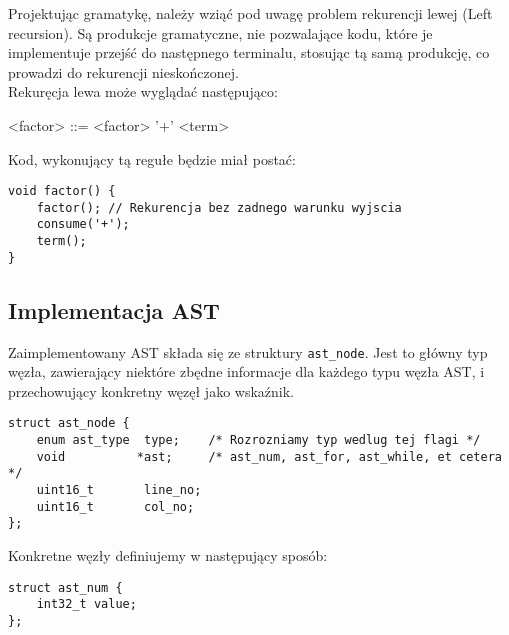 \documentclass[a4paper, 12pt]{extarticle}
\newcommand{\spacing}{\vskip 0.5cm}
\begin{document}
			Projektując gramatykę, należy wziąć pod uwagę problem rekurencji lewej (Left recursion).
			Są produkcje gramatyczne, nie pozwalające kodu, które je implementuje przejść do następnego
			terminalu, stosując tą samą produkcję, co prowadzi do rekurencji nieskończonej.
			\\
			
			Rekuręcja lewa może wyglądać następująco:

		    \begin{grammar}
		    	<factor> ::= <factor> '+' <term>
			\end{grammar}

			\spacing

			Kod, wykonujący tą regułe będzie miał postać:
			
			\begin{lstlisting}[caption={Rekurencja lewa}, label={lst:left-recursion}]
void factor() {
	factor(); // Rekurencja bez zadnego warunku wyjscia
	consume('+');
	term();
}
			\end{lstlisting}
			
			\newpage

		\subsection{Implementacja AST}

			Zaimplementowany AST składa się ze struktury \texttt{ast_node}. Jest to główny typ
			węzła, zawierający niektóre zbędne informacje dla każdego typu węzła AST, i przechowujący
			konkretny węzęł jako wskaźnik.

			\spacing

			\begin{lstlisting}[caption={Główny węzęł AST}, label={lst:ast-node}]
struct ast_node {
    enum ast_type  type;    /* Rozrozniamy typ wedlug tej flagi */
    void          *ast;     /* ast_num, ast_for, ast_while, et cetera */
    uint16_t       line_no;
    uint16_t       col_no;
};
			\end{lstlisting}
			
			\spacing
			
			Konkretne węzły definiujemy w następujący sposób:

			\spacing

			\begin{lstlisting}[caption={Konkretny węzęł AST}, label={lst:ast-concrete-node}]
struct ast_num {
    int32_t value;
};
			\end{lstlisting}
			
\end{document}
